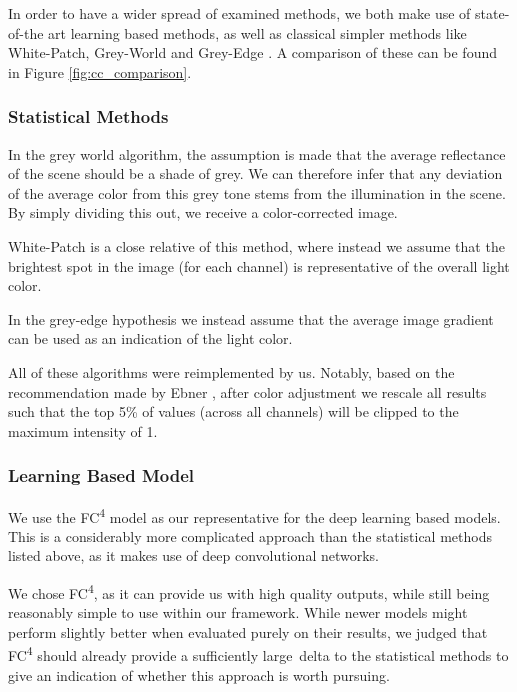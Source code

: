 In order to have a wider spread of examined methods, we both make use of state-of-the art
learning based methods, as well as classical simpler methods
like White-Patch, Grey-World \cite{EbnerConstancy} and Grey-Edge \cite{van2005color}.
A comparison of these can be found in Figure \ref{fig:cc_comparison}.

\subsubsection{Statistical Methods}

In the grey world algorithm, the assumption is made that the average reflectance of the scene should
be a shade of grey. We can therefore infer that any deviation of the average color from this grey tone stems from
the illumination in the scene. By simply dividing this out, we receive a color-corrected image.

White-Patch is a close relative of this method, where instead we assume that the brightest spot in the image (for each channel)
is representative of the overall light color.

In the grey-edge hypothesis we instead assume that the average image gradient can be used as an indication of the light color.

All of these algorithms were reimplemented by us. Notably, based on the recommendation made by Ebner \cite{EbnerConstancy},
after color adjustment we rescale all results such that the top 5\% of values (across all channels) will be clipped to
the maximum intensity of 1.

\subsubsection{Learning Based Model}

We use the FC\textsuperscript{4} model\cite{hu2017fc} as our representative for the deep learning based models. This is a considerably more complicated approach
than the statistical methods listed above, as it makes use of deep convolutional networks.

We chose FC\textsuperscript{4}, as it can provide us with high quality outputs, while still being reasonably simple to use within our framework. While newer
models might perform slightly better when evaluated purely on their results, we judged that FC\textsuperscript{4} should already provide a sufficiently large\
delta to the statistical methods to give an indication of whether this approach is worth pursuing.

